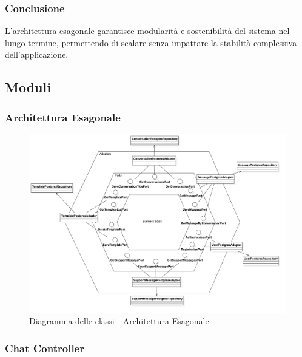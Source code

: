 \subsubsection{Conclusione}
L’architettura esagonale garantisce modularità e sostenibilità del sistema nel lungo termine, permettendo di scalare senza impattare la stabilità complessiva dell’applicazione.







\subsection{Moduli}
\subsubsection{Architettura Esagonale}
\begin{figure}[H]
    \centering
    \includegraphics[width=\linewidth, height=0.8\textheight, keepaspectratio]{./img/ArchitetturaEsagonaleStarUML.png}
    \caption{Diagramma delle classi - Architettura Esagonale}
    \label{fig:architettura_esagonale}
\end{figure}




\subsubsection{Chat Controller}
